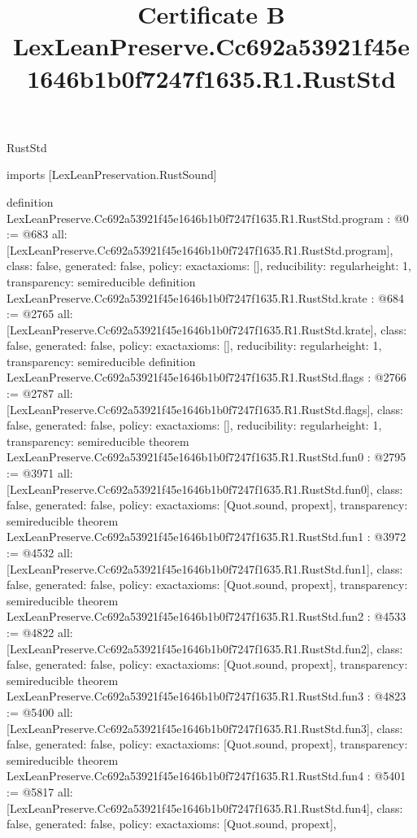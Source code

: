 \begin{lexlean}{RustStd}
\title{Certificate B LexLeanPreserve.Cc692a53921f45e1646b1b0f7247f1635.R1.RustStd}
\begin{coremodule}
imports [LexLeanPreservation.RustSound]

definition LexLeanPreserve.Cc692a53921f45e1646b1b0f7247f1635.R1.RustStd.program : @0 := @683 {
  all: [LexLeanPreserve.Cc692a53921f45e1646b1b0f7247f1635.R1.RustStd.program],
  class: false,
  generated: false,
  policy: exact{axioms: []},
  reducibility: regular{height: 1},
  transparency: semireducible
}
definition LexLeanPreserve.Cc692a53921f45e1646b1b0f7247f1635.R1.RustStd.krate : @684 := @2765 {
  all: [LexLeanPreserve.Cc692a53921f45e1646b1b0f7247f1635.R1.RustStd.krate],
  class: false,
  generated: false,
  policy: exact{axioms: []},
  reducibility: regular{height: 1},
  transparency: semireducible
}
definition LexLeanPreserve.Cc692a53921f45e1646b1b0f7247f1635.R1.RustStd.flags : @2766 := @2787 {
  all: [LexLeanPreserve.Cc692a53921f45e1646b1b0f7247f1635.R1.RustStd.flags],
  class: false,
  generated: false,
  policy: exact{axioms: []},
  reducibility: regular{height: 1},
  transparency: semireducible
}
theorem LexLeanPreserve.Cc692a53921f45e1646b1b0f7247f1635.R1.RustStd.fun0 : @2795 := @3971 {
  all: [LexLeanPreserve.Cc692a53921f45e1646b1b0f7247f1635.R1.RustStd.fun0],
  class: false,
  generated: false,
  policy: exact{axioms: [Quot.sound, propext]},
  transparency: semireducible
}
theorem LexLeanPreserve.Cc692a53921f45e1646b1b0f7247f1635.R1.RustStd.fun1 : @3972 := @4532 {
  all: [LexLeanPreserve.Cc692a53921f45e1646b1b0f7247f1635.R1.RustStd.fun1],
  class: false,
  generated: false,
  policy: exact{axioms: [Quot.sound, propext]},
  transparency: semireducible
}
theorem LexLeanPreserve.Cc692a53921f45e1646b1b0f7247f1635.R1.RustStd.fun2 : @4533 := @4822 {
  all: [LexLeanPreserve.Cc692a53921f45e1646b1b0f7247f1635.R1.RustStd.fun2],
  class: false,
  generated: false,
  policy: exact{axioms: [Quot.sound, propext]},
  transparency: semireducible
}
theorem LexLeanPreserve.Cc692a53921f45e1646b1b0f7247f1635.R1.RustStd.fun3 : @4823 := @5400 {
  all: [LexLeanPreserve.Cc692a53921f45e1646b1b0f7247f1635.R1.RustStd.fun3],
  class: false,
  generated: false,
  policy: exact{axioms: [Quot.sound, propext]},
  transparency: semireducible
}
theorem LexLeanPreserve.Cc692a53921f45e1646b1b0f7247f1635.R1.RustStd.fun4 : @5401 := @5817 {
  all: [LexLeanPreserve.Cc692a53921f45e1646b1b0f7247f1635.R1.RustStd.fun4],
  class: false,
  generated: false,
  policy: exact{axioms: [Quot.sound, propext]},
}
\end{coremodule}
\end{lexlean}
